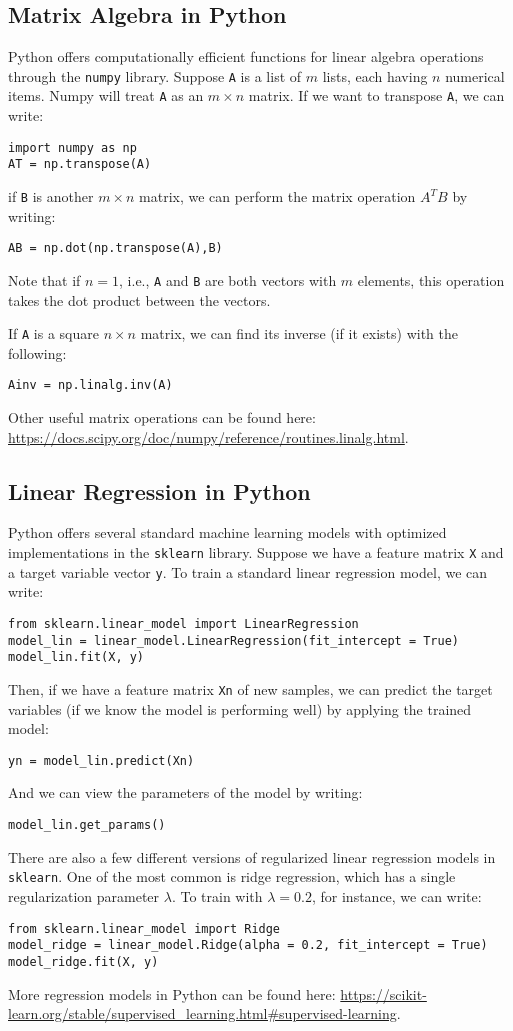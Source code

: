 \documentclass[10pt]{article}
\begin{document}
\subsection{Matrix Algebra in Python}
Python offers computationally efficient functions for linear algebra operations through the {\tt numpy} library. Suppose {\tt A} is a list of $m$ lists, each having $n$ numerical items. Numpy will treat {\tt A} as an $m \times n$ matrix. If we want to transpose {\tt A}, we can write:
\begin{verbatim}
import numpy as np
AT = np.transpose(A)
\end{verbatim}
if {\tt B} is another $m \times n$ matrix, we can perform the matrix operation $A^T B$ by writing:
\begin{verbatim}
AB = np.dot(np.transpose(A),B)
\end{verbatim}
Note that if $n = 1$, i.e., {\tt A} and {\tt B} are both vectors with $m$ elements, this operation takes the dot product between the vectors.

If {\tt A} is a square $n \times n$ matrix, we can find its inverse (if it exists) with the following:
\begin{verbatim}
Ainv = np.linalg.inv(A)
\end{verbatim}
Other useful matrix operations can be found here: \url{https://docs.scipy.org/doc/numpy/reference/routines.linalg.html}.

\subsection{Linear Regression in Python}
Python offers several standard machine learning models with optimized implementations in the {\tt sklearn} library. Suppose we have a feature matrix {\tt X} and a target variable vector {\tt y}. To train a standard linear regression model, we can write:
\begin{verbatim}
from sklearn.linear_model import LinearRegression
model_lin = linear_model.LinearRegression(fit_intercept = True)
model_lin.fit(X, y)
\end{verbatim}
Then, if we have a feature matrix {\tt Xn} of new samples, we can predict the target variables (if we know the model is performing well) by applying the trained model:
\begin{verbatim}
yn = model_lin.predict(Xn)
\end{verbatim}
And we can view the parameters of the model by writing:
\begin{verbatim}
model_lin.get_params()
\end{verbatim}
There are also a few different versions of regularized linear regression models in {\tt sklearn}. One of the most common is ridge regression, which has a single regularization parameter $\lambda$. To train with $\lambda = 0.2$, for instance, we can write:
\begin{verbatim}
from sklearn.linear_model import Ridge
model_ridge = linear_model.Ridge(alpha = 0.2, fit_intercept = True)
model_ridge.fit(X, y)
\end{verbatim}
More regression models in Python can be found here: \url{https://scikit-learn.org/stable/supervised_learning.html#supervised-learning}.
\end{document}
